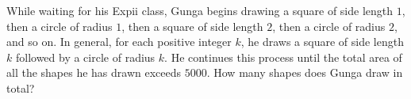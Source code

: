 While waiting for his Expii class, Gunga begins drawing a square of side length $1$, then a circle of radius $1$, then a square of side length $2$, then a circle of radius $2$, and so on. In general, for each positive integer $k$, he draws a square of side length $k$ followed by a circle of radius $k$. He continues this process until the total area of all the shapes he has drawn exceeds $5000$. How many shapes does Gunga draw in total?
